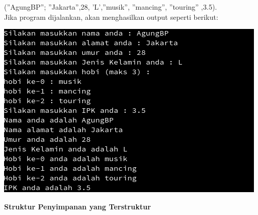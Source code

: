 \documentclass[a4paper,12pt]{article}
\begin{document}
(”AgungBP”; ”Jakarta”,28, ’L’,”musik”, ”mancing”, ”touring” ,3.5).\\
Jika program dijalankan, akan menghasilkan output seperti berikut:
\begin{center}
    \includegraphics[scale=.7]{prog12.png} 
\end{center}

\newpage
\textbf{Struktur Penyimpanan yang Terstruktur}
\end{document}
